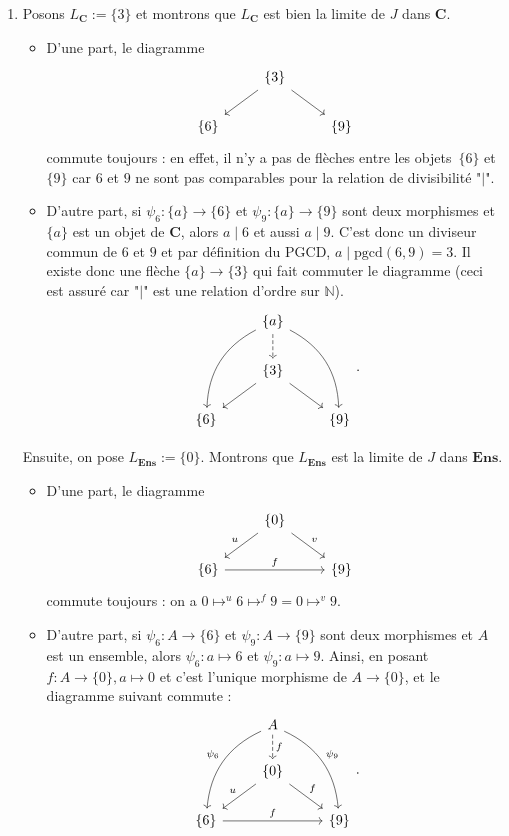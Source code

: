 \documentclass{../../td}
\begin{document}
  \begin{enumerate}
    \item Posons $L_\mathbf{C} := \{3\}$ et montrons que $L_\mathbf{C}$ est bien la limite de $J$ dans $\mathbf{C}$.
      \begin{itemize}
        \item D'une part, le diagramme \[
            \begin{tikzcd}
              & \{3\} \arrow{dr}{} \arrow[swap]{dl}{}\\
              \{6\} && \{9\}
            \end{tikzcd}
          \]
          commute toujours : en effet, il n'y a pas de flèches entre les objets~$\{6\}$ et $\{9\}$ car $6$ et $9$ ne sont pas comparables pour la relation de divisibilité "$\mid$".
        \item D'autre part, si $\psi_6 : \{a\}  \to \{6\}$ et $\psi_9 : \{a\}  \to \{9\}$ sont deux morphismes et $\{a\}$ est un objet de $\mathbf{C}$, alors $a \mid 6$ et aussi $a \mid 9$.
          C'est donc un diviseur commun de $6$ et $9$ et par définition du PGCD, $a  \mid \mathrm{pgcd}(6,9) = 3$.
          Il existe donc une flèche $\{a\} \to \{3\}$ qui fait commuter le diagramme (ceci est assuré car "$ \mid $" est une relation d'ordre sur $\mathds{N}$).
          \[
            \begin{tikzcd}
              & \{a\} \arrow[bend left]{ddr}{} \arrow[swap,bend right]{ddl}{} \arrow[dashed]{d}{}\\
              & \{3\} \arrow{dr}{} \arrow[swap]{dl}{}\\
              \{6\} && \{9\}
            \end{tikzcd}
          .\]
      \end{itemize}
      Ensuite, on pose $L_\mathbf{Ens} := \{0\}$.
      Montrons que $L_\mathbf{Ens}$ est la limite de $J$ dans $\mathbf{Ens}$.
      \begin{itemize}
        \item D'une part, le diagramme \[
            \begin{tikzcd}
              & \{0\} \arrow{dr}{v} \arrow[swap]{dl}{u}\\
              \{6\} \arrow{rr}{f} && \{9\}
            \end{tikzcd}
          \]
          commute toujours : on a $0 \mapsto^u 6 \mapsto^f 9 = 0\mapsto^v 9$.
        \item D'autre part, si $\psi_6 : A  \to \{6\}$ et $\psi_9 : A  \to \{9\}$ sont deux morphismes et $A$ est un ensemble, alors $\psi_6 : a \mapsto 6$ et $\psi_9 : a \mapsto 9$.
          Ainsi, en posant $f : A \to \{0\}, a \mapsto 0$ et c'est l'unique morphisme de $A \to \{0\}$,
          et le diagramme suivant commute :
          \[
            \begin{tikzcd}
              & A \arrow[bend left]{ddr}{\psi_9} \arrow[swap,bend right]{ddl}{\psi_6} \arrow[dashed]{d}{f}\\
              & \{0\}  \arrow{dr}{f} \arrow[swap]{dl}{u}\\
              \{6\} \arrow{rr}{f} && \{9\}
            \end{tikzcd}
          .\]
      \end{itemize}


\end{enumerate}
\end{document}
